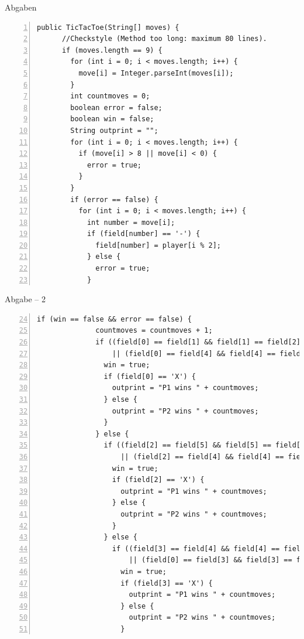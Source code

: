 \documentclass[18pt]{beamer}
\begin{document}
\begin{frame}[fragile]{Abgaben}
 \begin{lstlisting}[basicstyle=\tiny, numbers = left,stepnumber = 5]
    public TicTacToe(String[] moves) {
      //Checkstyle (Method too long: maximum 80 lines).
      if (moves.length == 9) {
        for (int i = 0; i < moves.length; i++) {
          move[i] = Integer.parseInt(moves[i]);
        }
        int countmoves = 0;
        boolean error = false;
        boolean win = false;
        String outprint = "";
        for (int i = 0; i < moves.length; i++) {
          if (move[i] > 8 || move[i] < 0) {
            error = true;
          }
        }
        if (error == false) {
          for (int i = 0; i < moves.length; i++) {
            int number = move[i];
            if (field[number] == '-') {
              field[number] = player[i % 2];
            } else {
              error = true;
            }
 \end{lstlisting}
\end{frame}
\begin{frame}[fragile]{Abgabe -- 2}
 \begin{lstlisting}[basicstyle=\tiny, numbers = left, stepnumber =5, firstnumber = 24]
          if (win == false && error == false) {
              countmoves = countmoves + 1;
              if ((field[0] == field[1] && field[1] == field[2] && field[0] != '-')
                  || (field[0] == field[4] && field[4] == field[8] && field[0] != '-')) {
                win = true;
                if (field[0] == 'X') {
                  outprint = "P1 wins " + countmoves;
                } else {
                  outprint = "P2 wins " + countmoves;
                }
              } else {
                if ((field[2] == field[5] && field[5] == field[8] && field[2] != '-')
                    || (field[2] == field[4] && field[4] == field[6] && field[2] != '-')) {
                  win = true;
                  if (field[2] == 'X') {
                    outprint = "P1 wins " + countmoves;
                  } else {
                    outprint = "P2 wins " + countmoves;
                  }
                } else {
                  if ((field[3] == field[4] && field[4] == field[5] && field[3] != '-')
                      || (field[0] == field[3] && field[3] == field[6] && field[3] != '-')) {
                    win = true;
                    if (field[3] == 'X') {
                      outprint = "P1 wins " + countmoves;
                    } else {
                      outprint = "P2 wins " + countmoves;
                    }
 \end{lstlisting}

\end{frame}
\end{document}
